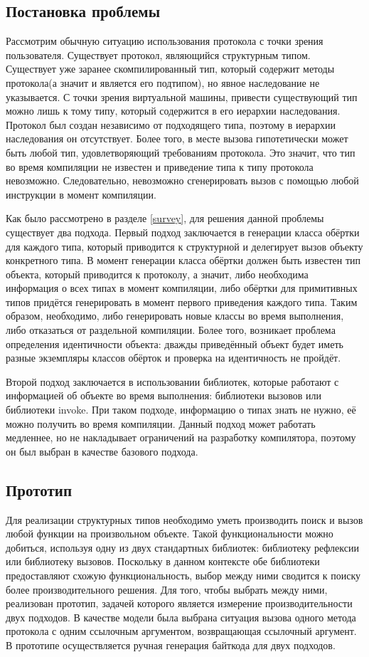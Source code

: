 
\subsection{Постановка проблемы}

Рассмотрим обычную ситуацию использования протокола с точки зрения пользователя. Существует протокол, являющийся структурным типом. Существует уже заранее скомпилированный тип, который содержит методы протокола(а значит и является его подтипом), но явное наследование не указывается. С точки зрения виртуальной машины, привести существующий тип можно лишь к тому типу, который содержится в его иерархии наследования. Протокол был создан независимо от подходящего типа, поэтому в иерархии наследования он отсутствует. Более того, в месте вызова гипотетически может быть любой тип, удовлетворяющий требованиям протокола. Это значит, что тип во время компиляции не известен и приведение типа к типу протокола невозможно. Следовательно, невозможно сгенерировать вызов с помощью любой инструкции в момент компиляции.

Как было рассмотрено в разделе \ref{survey}, для решения данной проблемы существует два подхода. Первый подход заключается в генерации класса обёртки для каждого типа, который приводится к структурной и делегирует вызов объекту конкретного типа. В момент генерации класса обёртки должен быть известен тип объекта, который приводится к протоколу, а значит, либо необходима информация о всех типах в момент компиляции, либо обёртки для примитивных типов придётся генерировать в момент первого приведения каждого типа. Таким образом, необходимо, либо генерировать новые классы во время выполнения, либо отказаться от раздельной компиляции. Более того, возникает проблема определения идентичности объекта: дважды приведённый объект будет иметь разные экземпляры классов обёрток и проверка на идентичность не пройдёт.

Второй подход заключается в использовании библиотек, которые работают с информацией об объекте во время выполнения: библиотеки вызовов или библиотеки invoke. При таком подходе, информацию о типах знать не нужно, её можно получить во время компиляции. Данный подход может работать медленнее, но не накладывает ограничений на разработку компилятора, поэтому он был выбран в качестве базового подхода.

\subsection{Прототип}
Для реализации структурных типов необходимо уметь производить поиск и вызов любой функции на произвольном объекте. Такой функциональности можно добиться, используя одну из двух стандартных библиотек: библиотеку рефлексии или библиотеку вызовов. Поскольку в данном контексте обе библиотеки предоставляют схожую функциональность, выбор между ними сводится к поиску более производительного решения. Для того, чтобы выбрать между ними, реализован прототип, задачей которого является измерение производительности двух подходов. В качестве модели была выбрана ситуация вызова одного метода протокола с одним ссылочным аргументом, возвращающая ссылочный аргумент. В прототипе осуществляется ручная генерация байткода для двух подходов.

